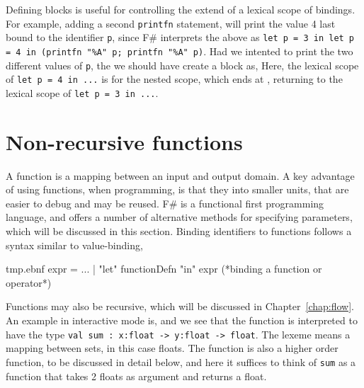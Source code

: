 Defining blocks is useful for controlling the extend of a lexical scope of bindings. For example, adding a second \lstinline!printfn! statement,
%
%
will print the value 4 last bound to the identifier \lstinline!p!, since F\# interprets the above as \lstinline!let p = 3 in let p = 4 in (printfn "%A" p; printfn "%A" p)!. %
Had we intented to print the two different values of \lstinline!p!, the we should have create a block as,
%
%
Here, the lexical scope of \lstinline!let p = 4 in ...! is for the nested scope, which ends at \lexeme{)}, returning to the lexical scope of \lstinline!let p = 3 in ...!. %

\section{Non-recursive functions}
\label{sec:functions}
A function is a mapping between an input and output domain. A key advantage of using functions, when programming, is that they  into smaller units, that are easier to debug and may be reused. F\# is a functional first programming language, and offers a number of alternative methods for specifying parameters, which will be discussed in this section. Binding identifiers to functions follows a syntax similar to value-binding,
%
\begin{verbatimwrite}{tmp.ebnf}
expr = ...
  | "let" functionDefn "in" expr (*binding a function or operator*)
\end{verbatimwrite}
%
Functions may also be recursive, which will be discussed in Chapter~\ref{chap:flow}. An example in interactive mode is,
%
%
and we see that the function is interpreted to have the type \lstinline!val sum : x:float -> y:float -> float!. The \lexeme{->} lexeme means a mapping between sets, in this case floats. The function is also a higher order function, to be discussed in detail below, and here it suffices to think of \lstinline!sum! as a function that takes 2 floats as argument and returns a float.

